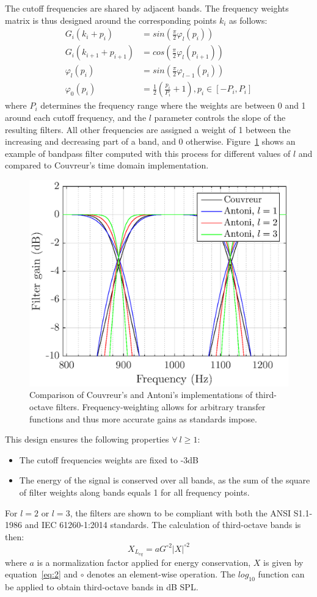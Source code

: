 \documentclass[12pt,times,onecolumn]{article}
\begin{document}
The cutoff frequencies are shared by adjacent bands. The frequency weights matrix is thus designed around the corresponding points $k_i$ as follows:
\begin{align}
G_i(k_i+p_i) &= sin\left(\frac{\pi}{2}\varphi_l(p_i)\right)\\
G_i(k_{i+1}+p_{i+1}) &= cos\left(\frac{\pi}{2}\varphi_l(p_{i+1})\right)\\
\varphi_l(p_i) &= sin\left(\frac{\pi}{2}\varphi_{l-1}(p_i)\right)\\
\varphi_0(p_i) &= \frac{1}{2}\left(\frac{p_i}{P_i}+1\right), p_i \in [-P_i, P_i]
\end{align}
where $P_i$ determines the frequency range where the weights are between 0 and 1 around each cutoff frequency, and the $l$ parameter controls the slope of the resulting filters. All other frequencies are assigned a weight of 1 between the increasing and decreasing part of a band, and 0 otherwise. Figure~\ref{fig:freq_filt} shows an example of bandpass filter computed with this process for different values of $l$ and compared to Couvreur's \cite{couvreur2004} time domain implementation.\\

\begin{figure}[htbp]
	\centering
		\includegraphics[width=0.5\columnwidth]{figures/tob_imp.eps}
	\caption{Comparison of Couvreur's and Antoni's implementations of third-octave filters. Frequency-weighting allows for arbitrary transfer functions and thus more accurate gains as standards impose.}
	\label{fig:freq_filt}
\end{figure}

\noindent This design ensures the following properties $\forall~l\geq 1$:
\begin{itemize}
\item The cutoff frequencies weights are fixed to -3dB
\item The energy of the signal is conserved over all bands, as the sum of the square of filter weights along bands equals 1 for all frequency points.
\end{itemize}
For $l = 2$ or $l = 3$, the filters are shown to be compliant with both the ANSI S1.1-1986 and IEC 61260-1:2014 standards. The calculation of third-octave bands is then:
\begin{equation}
X_{L_{eq}} = aG^{\circ2}|X|^{\circ2}
\end{equation}
where $a$ is a normalization factor applied for energy conservation, $X$ is given by equation~\ref{eq:2} and $\circ$ denotes an element-wise operation. The $log_{10}$ function can be applied to obtain third-octave bands in dB SPL.\\
\end{document}
